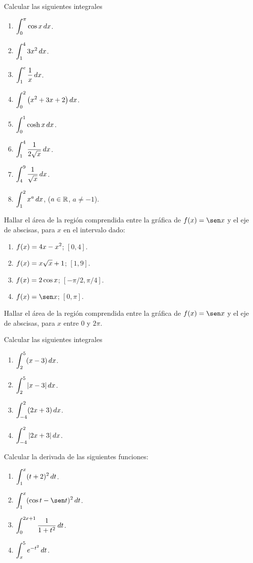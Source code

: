 \item Calcular las siguientes integrales
\begin{multicols}{2}
  \begin{enumerate}
    \item $\displaystyle \int_0^\pi \cos x \,dx$.
    \item $\displaystyle \int_1^4 3 x^2 \,dx$.
    \item $\displaystyle \int_1^e \frac1x \,dx$.
    \item $\displaystyle \int_0^2 \big( x^2+3x+2\big) \,dx$.
    \item $\displaystyle \int_0^1 \cosh x \,dx$.
    \item $\displaystyle \int_1^4 \frac{1}{2\sqrt{x}} \,dx$.
    \item $\displaystyle \int_4^9 \frac{1}{\sqrt x}\,dx$.
    \item $\displaystyle \int_1^2 x^a \,dx$, ($a\in \mathbb{R}$, $a\neq -1$).
  \end{enumerate}
\end{multicols}
\item Hallar el área de la región comprendida entre la gráfica de $f(x)=\sen x$ y el eje de abscisas, para $x$ en el intervalo dado:
\begin{multicols}{2}
  \begin{enumerate}
    \item $\displaystyle f(x)=4x-x^2$; $[0,4]$.
    \item $\displaystyle f(x)=x\sqrt{x}+1$; $[1,9]$.
    \item $\displaystyle f(x)=2\cos x$; $[-\pi/2,\pi/4]$.
    \item $\D f(x)=\sen x$; $[0,\pi]$.
  \end{enumerate}
\end{multicols}

\item Hallar el área de la región comprendida entre la gráfica de $f(x)=\sen x$ y el eje de abscisas, para $x$ entre $0$ y $2\pi$.
\item Calcular las siguientes integrales
\begin{multicols}{2}
  \begin{enumerate}
    \item $\displaystyle \int_2^5 (x-3) \,dx$.
    \item $\displaystyle \int_2^5 |x-3| \,dx$.
    \item $\displaystyle \int_{-4}^2 (2x+3) \,dx$.
    \item $\displaystyle \int_{-4}^2 |2x+3| \,dx$.
  \end{enumerate}
\end{multicols}

\item Calcular la derivada de las siguientes funciones:
\begin{multicols}{2}
  \begin{enumerate}
    \item $\displaystyle \int_1^x (t+2)^2 \,dt$.
    \item $\D \int_1^x (\cos t-\sen t)^2 \dt$.
    \item $\displaystyle \int_0^{2x+1} \frac{1}{1+t^2} \,dt$.
    \item $\displaystyle \int_x^5 e^{-t^2} \,dt$.
  \end{enumerate}
\end{multicols}

